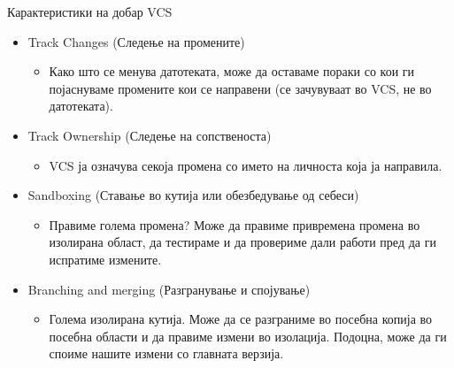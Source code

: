\begin{frame}{Карактеристики на добар VCS}
\begin{itemize}
    \item Track Changes (Следење на промените)
    \begin{itemize} 
        \item Како што се менува датотеката, може да оставаме пораки со кои ги
        појаснуваме промените кои се направени (се зачувуваат во VCS, не во
        датотеката).
    \end{itemize}
    \item Track Ownership (Следење на сопственоста)
    \begin{itemize} 
        \item VCS ја означува секоја промена со името на личноста која ја
        направила.
    \end{itemize}
    \item Sandboxing (Ставање во кутија или обезбедување од себеси)
    \begin{itemize} 
        \item Правиме голема промена? Може да правиме привремена промена
        во изолирана област, да тестираме и да провериме дали работи пред
        да ги испратиме измените.
    \end{itemize}
    \item Branching and merging (Разгранување и спојување)
    \begin{itemize} 
        \item Голема изолирана кутија. Може да се разграниме во посебна копија
        во посебна области и да правиме измени во изолација. Подоцна, може да
        ги споиме нашите измени со главната верзија.
    \end{itemize}
\end{itemize}
\end{frame}

